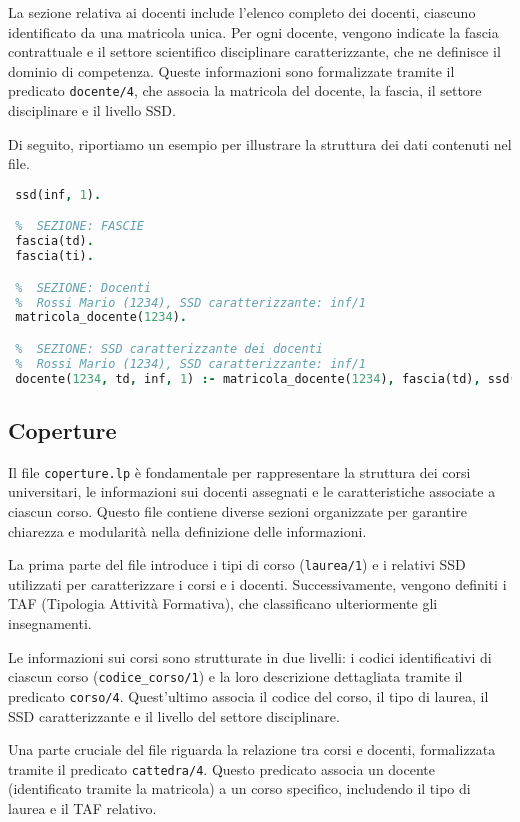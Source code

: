 La sezione relativa ai docenti include l'elenco completo dei docenti, ciascuno 
identificato da una matricola unica. Per ogni docente, vengono indicate la fascia 
contrattuale e il settore scientifico disciplinare caratterizzante, che ne 
definisce il dominio di competenza. Queste informazioni sono formalizzate tramite 
il predicato \texttt{docente/4}, che associa la matricola del docente, la fascia, 
il settore disciplinare e il livello SSD.

Di seguito, riportiamo un esempio per illustrare la struttura dei dati contenuti nel file.

\begin{lstlisting}[language=prolog, caption={Esempio struttura dati di \texttt{docenti.lp}.}]    
 %  SEZIONE: SSD
 ssd(inf, 1).

 %  SEZIONE: FASCIE
 fascia(td).
 fascia(ti).

 %  SEZIONE: Docenti
 %  Rossi Mario (1234), SSD caratterizzante: inf/1
 matricola_docente(1234).

 %  SEZIONE: SSD caratterizzante dei docenti
 %  Rossi Mario (1234), SSD caratterizzante: inf/1
 docente(1234, td, inf, 1) :- matricola_docente(1234), fascia(td), ssd(inf, 1).
\end{lstlisting}


\subsection{Coperture}\label{sec:rules-coperture}
Il file \texttt{coperture.lp} è fondamentale per rappresentare la struttura dei 
corsi universitari, le informazioni sui docenti assegnati e le caratteristiche 
associate a ciascun corso. Questo file contiene diverse sezioni organizzate per 
garantire chiarezza e modularità nella definizione delle informazioni.

La prima parte del file introduce i tipi di corso (\texttt{laurea/1}) e i relativi 
SSD utilizzati per caratterizzare i corsi e i docenti. Successivamente, vengono 
definiti i TAF (Tipologia Attività Formativa), che classificano ulteriormente 
gli insegnamenti.

Le informazioni sui corsi sono strutturate in due livelli: i codici identificativi 
di ciascun corso (\texttt{codice\_corso/1}) e la loro descrizione dettagliata 
tramite il predicato \texttt{corso/4}. Quest'ultimo associa il codice del corso, 
il tipo di laurea, il SSD caratterizzante e il livello del settore disciplinare.

Una parte cruciale del file riguarda la relazione tra corsi e docenti, formalizzata 
tramite il predicato \texttt{cattedra/4}. Questo predicato associa un docente 
(identificato tramite la matricola) a un corso specifico, includendo il tipo di 
laurea e il TAF relativo. 

